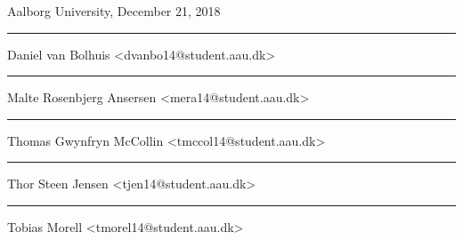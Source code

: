 \cleardoublepage
{
}
\clearpage

\vspace{\baselineskip}\hfill Aalborg University, December 21, 2018
\vfill\noindent
\begin{minipage}[b]{0.45\textwidth}
 \centering
 \rule{\textwidth}{0.5pt}\smallbreak
  Daniel van Bolhuis\smallbreak
 {\footnotesize <dvanbo14@student.aau.dk>}
\end{minipage}
\hfill
\begin{minipage}[b]{0.45\textwidth}
 \centering
 \rule{\textwidth}{0.5pt}\smallbreak
  Malte Rosenbjerg Ansersen\smallbreak
 {\footnotesize <mera14@student.aau.dk>}
\end{minipage}
\hfill
\vspace{3\baselineskip}

\begin{minipage}[b]{0.45\textwidth}
 \centering
 \rule{\textwidth}{0.5pt}\smallbreak
  Thomas Gwynfryn McCollin \smallbreak
 {\footnotesize <tmccol14@student.aau.dk>}
\end{minipage}
\hfill
\begin{minipage}[b]{0.45\textwidth}
 \centering
 \rule{\textwidth}{0.5pt}\smallbreak
  Thor Steen Jensen\smallbreak
 {\footnotesize <tjen14@student.aau.dk>}
\end{minipage}
\hfill
\vspace{3\baselineskip}

\begin{minipage}[b]{0.45\textwidth}
 \centering
 \rule{\textwidth}{0.5pt}\smallbreak
  Tobias Morell\smallbreak
 {\footnotesize <tmorel14@student.aau.dk>}
\end{minipage}
\hfill